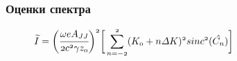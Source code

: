 \documentclass[14pt, hyperref = {colorlinks}]{beamer}
\begin{document}
\small
\begin{frame}
\frametitle{Оценки спектра}\label{t1}
\vspace{-5pt}
\begin{figure}[h]
\begin{minipage}[h]{0.49\linewidth}
	\vspace{-10pt}
\end{minipage}	

\end{figure}
\vspace{-15pt}
\begin{figure}[h]
$\mathnormal{{\widetilde{I}} =
	\bigg(\cfrac{\omega eA_{JJ}}{2c^2 \gamma z_0}\bigg)^2\bigg[
	\displaystyle\sum\limits_{n =-2}^{2}(K_0 + n\Delta K)^2sinc^2(\hat{C_n})}\bigg]$\\

\end{figure}
\end{frame}
\end{document}
